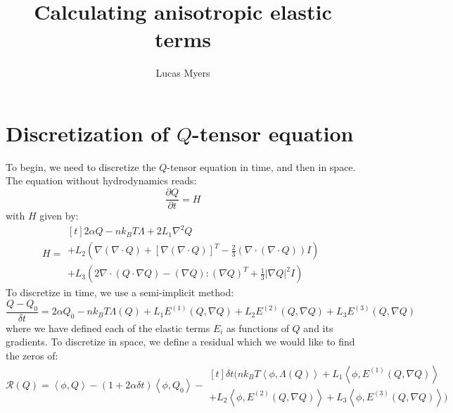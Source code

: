 \documentclass[reqno]{article}
\begin{document}
\title{Calculating anisotropic elastic terms}
\author{Lucas Myers}
\maketitle

\section{Discretization of $Q$-tensor equation}

To begin, we need to discretize the $Q$-tensor equation in time, and then in space.
The equation without hydrodynamics reads:
\begin{equation} \label{eq:Q-tensor-equation}
    \frac{\partial Q}{\partial t}
    =
    H
\end{equation}
with $H$ given by:
\begin{equation}
    H
    =
    \begin{multlined}[t]
      2 \alpha Q - n k_B T \Lambda + 2 L_1 \nabla^2 Q \\
      + L_2 \left(
        \nabla \left( \nabla \cdot Q \right)
        + \left[ \nabla \left( \nabla \cdot Q \right) \right]^T
        - \tfrac23 \left( \nabla \cdot \left( \nabla \cdot Q \right) \right) I
      \right) \\
      + L_3 \left(
        2 \nabla \cdot \left( Q \cdot \nabla Q \right)
        - \left( \nabla Q \right) : \left( \nabla Q \right)^T
        + \tfrac13 \left| \nabla Q \right|^2 I
      \right)
    \end{multlined}
\end{equation}
To discretize in time, we use a semi-implicit method:
\begin{equation}
    \frac{Q - Q_0}{\delta t}
    =
    2 \alpha Q_0 - n k_B T \Lambda(Q) 
    + L_1 E^{(1)}(Q, \nabla Q)
    + L_2 E^{(2)}(Q, \nabla Q)
    + L_3 E^{(3)}(Q, \nabla Q)
\end{equation}
where we have defined each of the elastic terms $E_i$ as functions of $Q$ and its gradients.
To discretize in space, we define a residual which we would like to find the zeros of:
\begin{equation}
    \mathcal{R}(Q)
    =
    \left<\phi, Q\right> 
    - \left(1 + 2 \alpha \delta t \right) \left<\phi, Q_0\right>
    - 
    \begin{multlined}[t]
    \delta t \bigl(
        n k_B T \left<\phi, \Lambda(Q) \right>
        + L_1 \left<\phi, E^{(1)}(Q, \nabla Q)\right> \\
        + L_2 \left<\phi, E^{(2)}(Q, \nabla Q)\right>
        + L_3 \left<\phi, E^{(3)}(Q, \nabla Q)\right>
    \bigr)
    \end{multlined}
\end{equation}
\end{document}

